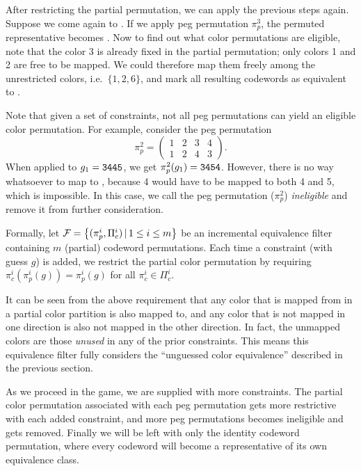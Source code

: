 After restricting the partial permutation, we can apply the previous steps again. Suppose we come again to . If we apply peg permutation $\pi_p^3$, the permuted representative becomes . Now to find out what color permutations are eligible, note that the color 3 is already fixed in the partial permutation; only colors 1 and 2 are free to be mapped. We could therefore map them freely among the unrestricted colors, i.e.\ $\{1, 2, 6\}$, and mark all resulting codewords as equivalent to .

Note that given a set of constraints, not all peg permutations can yield an eligible color permutation. For example, consider the peg permutation
\[
\pi_p^2 = 
\begin{pmatrix}
1 & 2 & 3 & 4 \\
1 & 2 & 4 & 3
\end{pmatrix} .
\]
When applied to $g_1 = \texttt{3445}$, we get $\pi_p^2(g_1) = \texttt{3454}$. However, there is no way whatsoever to map  to , because 4 would have to be mapped to both 4 and 5, which is impossible. In this case, we call the peg permutation ($\pi_p^2$) \emph{ineligible} and remove it from further consideration.

Formally, let $\mathcal{F} = \left\{(\pi_p^i, \Pi_c^i) \,|\, 1 \le i \le m \right\}$ be an incremental equivalence filter containing $m$ (partial) codeword permutations. Each time a constraint (with guess $g$) is added, we restrict the partial color permutation by requiring $\pi_c^i ( \pi_p^i (g) ) = \pi_p^i (g)$ for all $\pi_c^i \in \Pi_c^i$. 

It can be seen from the above requirement that any color that is mapped from in a partial color partition is also mapped to, and any color that is not mapped in one direction is also not mapped in the other direction. In fact, the unmapped colors are those \emph{unused} in any of the prior constraints. This means this equivalence filter fully considers the ``unguessed color equivalence'' described in the previous section.

As we proceed in the game, we are supplied with more constraints. The partial color permutation associated with each peg permutation gets more restrictive with each
added constraint, and more peg permutations becomes ineligible and gets removed. Finally we will be left with only the identity codeword permutation, where every codeword will become a representative of its own equivalence class.

